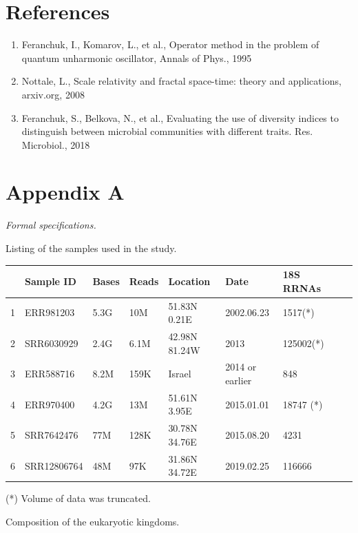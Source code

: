 \documentclass[a4paper]{article}
\begin{document}
\section*{References}

\begin{enumerate}

\item Feranchuk, I., Komarov, L., et al., Operator method in the problem of quantum unharmonic oscillator, Annals of Phys., 1995 

\item Nottale, L., Scale relativity and fractal space-time: theory and applications, arxiv.org, 2008

\item Feranchuk, S., Belkova, N., et al., Evaluating the use of diversity indices to distinguish between microbial communities with different traits. Res. Microbiol., 2018

\end{enumerate}

\newpage
\section*{Appendix A}

\textit{Formal specifications.}

\vskip 5pt

Listing of the samples used in the study.

\vskip 5pt

\begin{tabular}{lllllllll}
\hline
&Sample ID&Bases&Reads&Location&Date&18S RRNAs\\
\hline
1&ERR981203&5.3G&10M&51.83N 0.21E&2002.06.23&1517(*)\\
2&SRR6030929&2.4G&6.1M&42.98N 81.24W&2013&125002(*)\\
3&ERR588716&8.2M&159K&Israel&2014 or earlier&848\\
4&ERR970400&4.2G&13M&51.61N 3.95E&2015.01.01&18747 (*)\\
5&SRR7642476&77M&128K&30.78N 34.76E&2015.08.20&4231\\
6&SRR12806764&48M&97K&31.86N 34.72E&2019.02.25&116666\\
\hline
\end{tabular}

{\small(*) Volume of data was truncated.}

\vskip 5pt

Composition of the eukaryotic kingdoms.
\end{document}
